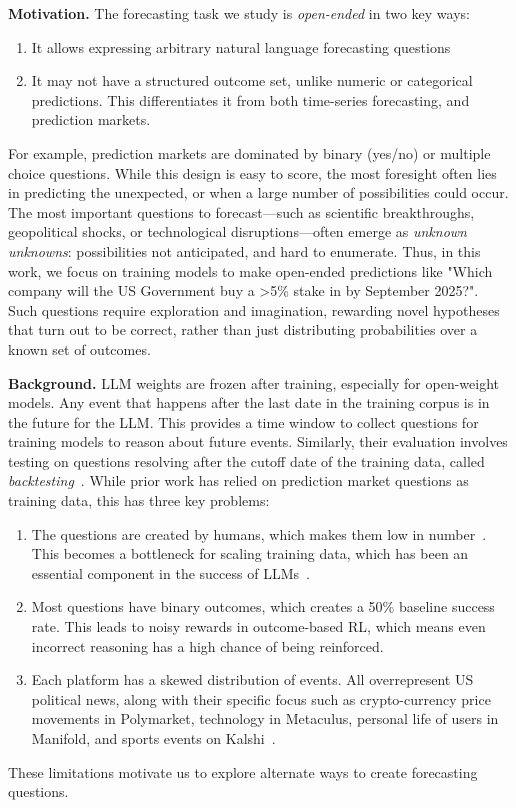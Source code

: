 \documentclass{article} %
\begin{document}
\textbf{Motivation.} The forecasting task we study is \textit{open-ended} in two key ways: 
\begin{enumerate}
    \item It allows expressing arbitrary natural language forecasting questions
    \item It may not have a structured outcome set, unlike numeric or categorical predictions. This differentiates it from both time-series forecasting, and prediction markets.
\end{enumerate}
For example, prediction markets are dominated by binary (yes/no) or multiple choice questions. While this design is easy to score, the most foresight often lies in predicting the unexpected, or when a large number of possibilities could occur. The most important questions to forecast---such as scientific breakthroughs, geopolitical shocks, or technological disruptions---often emerge as \emph{unknown unknowns}: possibilities not anticipated, and hard to enumerate. Thus, in this work, we focus on training models to make open-ended predictions like "Which company will the US Government buy a >5\% stake in by September 2025?". Such questions require exploration and imagination, rewarding novel hypotheses that turn out to be correct, rather than just distributing probabilities over a known set of outcomes.\vspace{0.15cm} 

\textbf{Background.} LLM weights are frozen after training, especially for open-weight models. Any event that happens after the last date in the training corpus is in the future for the LLM. This provides a time window to collect questions for training models to reason about future events. Similarly, their evaluation involves testing on questions resolving after the cutoff date of the training data, called \textit{backtesting}~\citep{Tashman2000}. While prior work has relied on prediction market questions as training data, this has three key problems:
\begin{enumerate}
    \item The questions are created by humans, which makes them low in number~\citep{paleka2025pitfalls}. This becomes a bottleneck for scaling training data, which has been an essential component in the success of LLMs~\citep{kaplan2020scalinglawsneurallanguage, lu2025internet}.
    \item Most questions have binary outcomes, which creates a 50\% baseline success rate. This leads to noisy rewards in outcome-based RL, which means even incorrect reasoning has a high chance of being reinforced.
    \item Each platform has a skewed distribution of events. All overrepresent US political news, along with their specific focus such as crypto-currency price movements in Polymarket, technology in Metaculus, personal life of users in Manifold, and sports events on Kalshi~\citep{paleka2025pitfalls}. 
\end{enumerate}   
These limitations motivate us to explore alternate ways to create forecasting questions.\vspace{0.15cm} 
\end{document}
